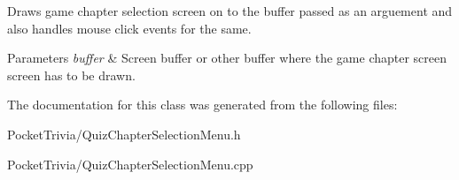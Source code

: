 Draws game chapter selection screen on to the buffer passed as an arguement and also handles mouse click events for the same. 


\begin{DoxyParams}{Parameters}
{\em buffer} & Screen buffer or other buffer where the game chapter screen screen has to be drawn. \\
\hline
\end{DoxyParams}


The documentation for this class was generated from the following files\+:\begin{DoxyCompactItemize}
\item 
Pocket\+Trivia/Quiz\+Chapter\+Selection\+Menu.\+h\item 
Pocket\+Trivia/Quiz\+Chapter\+Selection\+Menu.\+cpp\end{DoxyCompactItemize}
